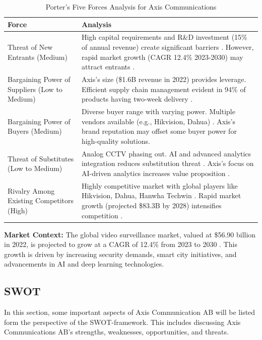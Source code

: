\documentclass{article}
\begin{document}
\begin{table}[h]
\small
\begin{tabular}{|p{}|p{}|}
\hline
\textbf{Force} & \textbf{Analysis} \\
\hline
Threat of New Entrants \newline (Medium) & 
High capital requirements and R\&D investment (15\% of annual revenue) create significant barriers \cite{axis_newsroom2023}. However, rapid market growth (CAGR 12.4\% 2023-2030) may attract entrants \cite{grandview2023}. \\
\hline
Bargaining Power of Suppliers \newline (Low to Medium) & 
Axis's size (\$1.6B revenue in 2022) provides leverage. Efficient supply chain management evident in 94\% of products having two-week delivery \cite{axis_newsroom2023}. \\
\hline
Bargaining Power of Buyers \newline (Medium) & 
Diverse buyer range with varying power. Multiple vendors available (e.g., Hikvision, Dahua) \cite{stellar2023}. Axis's brand reputation may offset some buyer power for high-quality solutions. \\
\hline
Threat of Substitutes \newline (Low to Medium) & 
Analog CCTV phasing out. AI and advanced analytics integration reduces substitution threat \cite{grandview2023}. Axis's focus on AI-driven analytics increases value proposition \cite{axis_website}. \\
\hline
Rivalry Among Existing Competitors \newline (High) & 
Highly competitive market with global players like Hikvision, Dahua, Hanwha Techwin \cite{stellar2023, grandview2023}. Rapid market growth (projected \$83.3B by 2028) intensifies competition \cite{marketsandmarkets2023}. \\
\hline
\end{tabular}
\caption{Porter's Five Forces Analysis for Axis Communications}
\label{tab:porters_five_forces}
\end{table}

\textbf{Market Context:} The global video surveillance market, valued at \$56.90 billion in 2022, is projected to grow at a CAGR of 12.4\% from 2023 to 2030 \cite{grandview2023}. This growth is driven by increasing security demands, smart city initiatives, and advancements in AI and deep learning technologies.


\subsection{SWOT}
In this section, some important aspects of Axis Communication AB will be listed form the perspective of the SWOT-framework. This includes discussing Axis Communications AB's strengths, weaknesses, opportunities, and threats.
\end{document}
